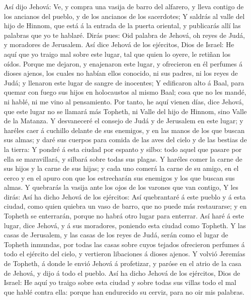  Así dijo Jehová: Ve, y compra una vasija de barro del
alfarero, y lleva contigo de los ancianos del pueblo, y de los ancianos
de los sacerdotes;  Y saldrás al valle del hijo de Hinnom,
que está á la entrada de la puerta oriental, y publicarás allí las
palabras que yo te hablaré.  Dirás pues: Oid palabra de
Jehová, oh reyes de Judá, y moradores de Jerusalem. Así dice Jehová de
los ejércitos, Dios de Israel: He aquí que yo traigo mal sobre este
lugar, tal que quien lo oyere, le retiñan los oídos. 
Porque me dejaron, y enajenaron este lugar, y ofrecieron en él perfumes
á dioses ajenos, los cuales no habían ellos conocido, ni sus padres, ni
los reyes de Judá; y llenaron este lugar de sangre de inocentes;
 Y edificaron alto á Baal, para quemar con fuego sus hijos
en holocaustos al mismo Baal; cosa que no les mandé, ni hablé, ni me
vino al pensamiento.  Por tanto, he aquí vienen días, dice
Jehová, que este lugar no se llamará más Topheth, ni Valle del hijo de
Hinnom, sino Valle de la Matanza.  Y desvaneceré el
consejo de Judá y de Jerusalem en este lugar; y haréles caer á cuchillo
delante de sus enemigos, y en las manos de los que buscan sus almas; y
daré sus cuerpos para comida de las aves del cielo y de las bestias de
la tierra:  Y pondré á esta ciudad por espanto y silbo:
todo aquel que pasare por ella se maravillará, y silbará sobre todas sus
plagas.  Y haréles comer la carne de sus hijos y la carne
de sus hijas; y cada uno comerá la carne de su amigo, en el cerco y en
el apuro con que los estrecharán sus enemigos y los que buscan sus
almas.  Y quebrarás la vasija ante los ojos de los
varones que van contigo,  Y les dirás: Así ha dicho
Jehová de los ejércitos: Así quebrantaré á este pueblo y á esta ciudad,
como quien quiebra un vaso de barro, que no puede más restaurarse; y en
Topheth se enterrarán, porque no habrá otro lugar para enterrar.
 Así haré á este lugar, dice Jehová, y á sus moradores,
poniendo esta ciudad como Topheth.  Y las casas de
Jerusalem, y las casas de los reyes de Judá, serán como el lugar de
Topheth inmundas, por todas las casas sobre cuyos tejados ofrecieron
perfumes á todo el ejército del cielo, y vertieron libaciones á dioses
ajenos.  Y volvió Jeremías de Topheth, á donde le envió
Jehová á profetizar, y paróse en el atrio de la casa de Jehová, y dijo á
todo el pueblo.  Así ha dicho Jehová de los ejércitos,
Dios de Israel: He aquí yo traigo sobre esta ciudad y sobre todas sus
villas todo el mal que hablé contra ella: porque han endurecido su
cerviz, para no oir mis palabras.


